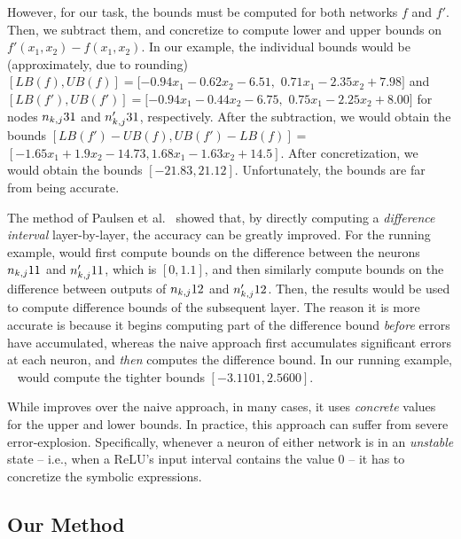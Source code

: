 However, for our task, the bounds must be computed for both networks $
f $ and $ f' $.  Then, we subtract them, and concretize to compute
lower and upper bounds on $ f'(x_1, x_2) - f(x_1, x_2) $.
%
In our example, the individual bounds would be (approximately, due to
rounding) $[LB(f),UB(f)] = [-0.94x_1 -0.62x_2 -6.51, $ $ 0.71x_1
-2.35x_2 +7.98] $ and $ [LB(f'),UB(f')] = [-0.94x_1 -0.44x_2 -6.75,$ $
0.75x_1 -2.25x_2 +8.00] $ for nodes $ n_{k,j}{3}{1} $ and $ n'_{k,j}{3}{1} $,
respectively.  After the subtraction, we would obtain the bounds
$[LB(f')-UB(f), UB(f')-LB(f)] = $ $ [-1.65x_1 + 1.9x_2 - 14.73,
1.68x_1 - 1.63x_2 + 14.5] $.  After concretization, we would obtain
the bounds $ [-21.83, 21.12] $.  Unfortunately, the bounds are far
from being accurate.

The \ReluDiff{} method of Paulsen et al.~\cite{paulsen2020reludiff} showed
that, by directly computing a \textit{difference interval}
layer-by-layer, the accuracy can be greatly improved.  For the running
example, \ReluDiff{} would first compute bounds on the difference
between the neurons $ n_{k,j}{1}{1} $ and $ n'_{k,j}{1}{1} $, which is $ [0,
1.1] $, and then similarly compute bounds on the difference between
outputs of $ n_{k,j}{1}{2} $ and $ n'_{k,j}{1}{2} $. Then, the results would be
used to compute difference bounds of the subsequent layer.
%
The reason it is more accurate is because it begins computing part of
the difference bound \emph{before} errors have accumulated, whereas
the naive approach first accumulates significant errors at each
neuron, and \emph{then} computes the difference bound.
%
In our running example, \ReluDiff{}~\cite{paulsen2020reludiff} would
compute the tighter bounds $ [-3.1101, 2.5600] $.


While \ReluDiff{} improves over the naive approach, in many cases,
it uses \emph{concrete} values for the upper and lower bounds.
In practice, this approach can suffer from severe error-explosion.
Specifically,
whenever a neuron of either network is in an \textit{unstable} state --
i.e., when a ReLU's input interval contains the value 0 -- it has to
concretize the symbolic expressions.



\subsection{Our Method}


